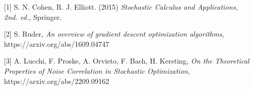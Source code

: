 \begin{talk}
\begin{enumerate}
\item[{[1]}] S. N. Cohen, R. J. Elliott. (2015)
{\it Stochastic Calculus and Applications, 2nd. ed.}, Springer.
\item[{[2]}] S. Ruder, {\it An overview of gradient descent optimization
algorithms}, \\ https://arxiv.org/abs/1609.04747

\item[{[3]}] A. Lucchi, F. Proske, A. Orvieto, F. Bach, H. Kersting, {\it On the Theoretical Properties of Noise
Correlation in Stochastic Optimization}, https://arxiv.org/abs/2209.09162

\end{enumerate}

\end{talk}

